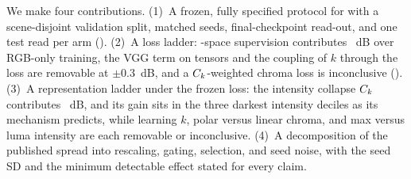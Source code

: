 We make four contributions. (1)~A frozen, fully specified protocol for \mname with a
scene-disjoint validation split, matched seeds, final-checkpoint read-out, and one test read
per arm (). (2)~A loss ladder: \hvi-space supervision contributes
~dB over RGB-only training, the VGG term on \hvi tensors and the coupling of $k$ through the loss are removable at
$\pm 0.3$~dB, and a $C_k$-weighted chroma loss is inconclusive ().
(3)~A representation ladder under the frozen loss: the intensity collapse $C_k$ contributes
~dB, and its gain sits in the three darkest intensity deciles as its mechanism
predicts, while learning $k$, polar versus linear chroma, and max versus luma intensity are
each removable or inconclusive. (4)~A decomposition of the published \dataset spread into rescaling, gating, selection,
and seed noise, with the seed SD and the minimum detectable effect stated for every claim.
